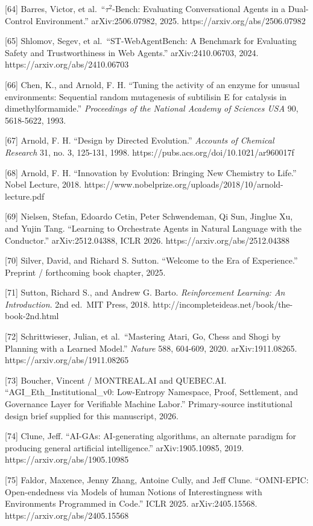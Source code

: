 {[}64{]} Barres, Victor, et al.~``\(\tau^2\)-Bench: Evaluating
Conversational Agents in a Dual-Control Environment.'' arXiv:2506.07982,
2025. https://arxiv.org/abs/2506.07982

{[}65{]} Shlomov, Segev, et al.~``ST-WebAgentBench: A Benchmark for
Evaluating Safety and Trustworthiness in Web Agents.'' arXiv:2410.06703,
2024. https://arxiv.org/abs/2410.06703

{[}66{]} Chen, K., and Arnold, F. H. ``Tuning the activity of an enzyme
for unusual environments: Sequential random mutagenesis of subtilisin E
for catalysis in dimethylformamide.'' \emph{Proceedings of the National
Academy of Sciences USA} 90, 5618-5622, 1993.

{[}67{]} Arnold, F. H. ``Design by Directed Evolution.'' \emph{Accounts
of Chemical Research} 31, no. 3, 125-131, 1998.
https://pubs.acs.org/doi/10.1021/ar960017f

{[}68{]} Arnold, F. H. ``Innovation by Evolution: Bringing New Chemistry
to Life.'' Nobel Lecture, 2018.
https://www.nobelprize.org/uploads/2018/10/arnold-lecture.pdf

{[}69{]} Nielsen, Stefan, Edoardo Cetin, Peter Schwendeman, Qi Sun,
Jinglue Xu, and Yujin Tang. ``Learning to Orchestrate Agents in Natural
Language with the Conductor.'' arXiv:2512.04388, ICLR 2026.
https://arxiv.org/abs/2512.04388

{[}70{]} Silver, David, and Richard S. Sutton. ``Welcome to the Era of
Experience.'' Preprint / forthcoming book chapter, 2025.

{[}71{]} Sutton, Richard S., and Andrew G. Barto. \emph{Reinforcement
Learning: An Introduction}. 2nd ed.~MIT Press, 2018.
http://incompleteideas.net/book/the-book-2nd.html

{[}72{]} Schrittwieser, Julian, et al.~``Mastering Atari, Go, Chess and
Shogi by Planning with a Learned Model.'' \emph{Nature} 588, 604-609,
2020. arXiv:1911.08265. https://arxiv.org/abs/1911.08265

{[}73{]} Boucher, Vincent / MONTREAL.AI and QUEBEC.AI.
``AGI\_Eth\_Institutional\_v0: Low-Entropy Namespace, Proof, Settlement,
and Governance Layer for Verifiable Machine Labor.'' Primary-source
institutional design brief supplied for this manuscript, 2026.

{[}74{]} Clune, Jeff. ``AI-GAs: AI-generating algorithms, an alternate
paradigm for producing general artificial intelligence.''
arXiv:1905.10985, 2019. https://arxiv.org/abs/1905.10985

{[}75{]} Faldor, Maxence, Jenny Zhang, Antoine Cully, and Jeff Clune.
``OMNI-EPIC: Open-endedness via Models of human Notions of
Interestingness with Environments Programmed in Code.'' ICLR 2025.
arXiv:2405.15568. https://arxiv.org/abs/2405.15568

